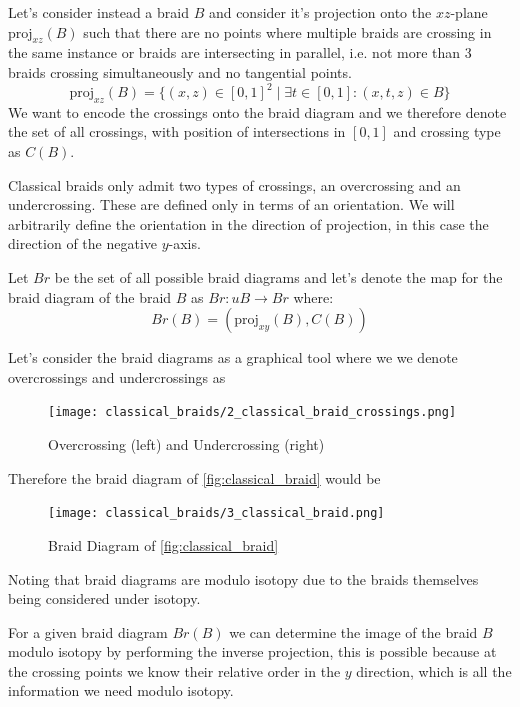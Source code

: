 Let's consider instead a braid \( B \) and consider it's projection onto the \( xz \)-plane \( \text{proj}_{xz}(B) \) such that there are no points where multiple braids are crossing in the same instance or braids are intersecting in parallel, i.e. not more than 3 braids crossing simultaneously and no tangential points.
\[ \text{proj}_{xz}(B) = \{ (x, z) \in [0, 1]^2 \mid \exists t \in [0, 1] : (x, t, z) \in B\} \]
We want to encode the crossings onto the braid diagram and we therefore denote the set of all crossings, with position of intersections in \( [0, 1] \) and crossing type as \( C(B) \). 

Classical braids only admit two types of crossings, an overcrossing and an undercrossing. These are defined only in terms of an orientation.
We will arbitrarily define the orientation in the direction of projection, in this case the direction of the negative \( y \)-axis. 

Let \( Br \) be the set of all possible braid diagrams and let's denote the map for the braid diagram of the braid \( B \) as \( Br : uB \to Br \) where:
\[ Br(B) = (\text{proj}_{xy}(B), C(B)) \]

\begin{Remark}
    
Let's consider the braid diagrams as a graphical tool where we we denote overcrossings and undercrossings as

\begin{figure}[H]
    \centering
    \texttt{[image: classical\_braids/2\_classical\_braid\_crossings.png]}
    \caption{Overcrossing (left) and Undercrossing (right)}
    \label{fig:overcrossing_undercrossing}
\end{figure}

Therefore the braid diagram of \cref{fig:classical_braid} would be

\begin{figure}[H]
    \centering
    \texttt{[image: classical\_braids/3\_classical\_braid.png]}
    \caption{Braid Diagram of \cref{fig:classical_braid}}
    \label{fig:classical_diagram}
\end{figure}
Noting that braid diagrams are modulo isotopy due to the braids themselves being considered under isotopy. 
\end{Remark}

\begin{Remark}
For a given braid diagram \( Br(B) \) we can determine the image of the braid \( B \) modulo isotopy by performing the inverse projection, this is possible because at the crossing points we know their relative order in the \( y \) direction, which is all the information we need modulo isotopy.  
\end{Remark}


